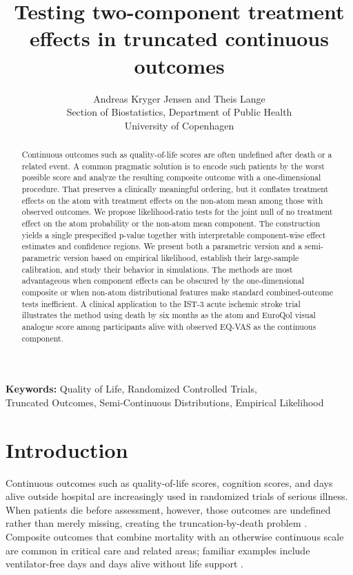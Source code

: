 \documentclass[11pt]{article}
\title{Testing two-component treatment effects in truncated continuous outcomes}
\author{
  Andreas Kryger Jensen and Theis Lange\\
  Section of Biostatistics, Department of Public Health\\
  University of Copenhagen
}
\date{}
\begin{document}
\maketitle

\begin{abstract}
Continuous outcomes such as quality-of-life scores are often undefined after death or a related event. A common pragmatic solution is to encode such patients by the worst possible score and analyze the resulting composite outcome with a one-dimensional procedure. That preserves a clinically meaningful ordering, but it conflates treatment effects on the atom with treatment effects on the non-atom mean among those with observed outcomes. We propose likelihood-ratio tests for the joint null of no treatment effect on the atom probability or the non-atom mean component. The construction yields a single prespecified p-value together with interpretable component-wise effect estimates and confidence regions. We present both a parametric version and a semi-parametric version based on empirical likelihood, establish their large-sample calibration, and study their behavior in simulations. The methods are most advantageous when component effects can be obscured by the one-dimensional composite or when non-atom distributional features make standard combined-outcome tests inefficient. A clinical application to the IST-3 acute ischemic stroke trial illustrates the method using death by six months as the atom and EuroQol visual analogue score among participants alive with observed EQ-VAS as the continuous component.
\end{abstract}

\begin{center}
\textbf{Keywords:} Quality of Life, Randomized Controlled Trials,\\
Truncated Outcomes, Semi-Continuous Distributions, Empirical Likelihood
\end{center}

\section{Introduction}

Continuous outcomes such as quality-of-life scores, cognition scores, and days alive outside hospital are increasingly used in randomized trials of serious illness. When patients die before assessment, however, those outcomes are undefined rather than merely missing, creating the truncation-by-death problem \citep{Frangakis_2002,Colantuoni_2018}. Composite outcomes that combine mortality with an otherwise continuous scale are common in critical care and related areas; familiar examples include ventilator-free days and days alive without life support \citep{10.1001/jama.2021.18295,Yehya_2019}.
\end{document}
